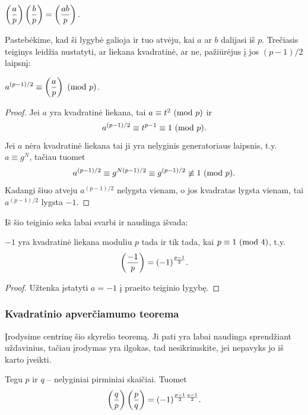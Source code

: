 \begin{teig} $\displaystyle \left(\frac{a}{p}\right)\left(\frac{b}{p}\right) = \left(\frac{ab}{p}\right).$ 
\end{teig}

Pastebėkime, kad ši lygybė galioja ir tuo atvėju, kai $a$ ar $b$ dalijasi
iš $p$. Trečiasis teiginys leidžia nustatyti, ar liekana kvadratinė, ar ne, pažiūrėjus
į jos $(p-1)/2$ laipsnį:

\begin{teig} $\displaystyle a^{(p-1)/2} \equiv \left(\frac{a}{p}\right) \ (\text{mod } p)$.
\end{teig}

\begin{proof} Jei $a$ yra kvadratinė liekana, tai $a\equiv t^2 \ (\text{mod } p)$ ir
  $$a^{(p-1)/2} \equiv t^{p-1} \equiv 1 \ (\text{mod } p).$$ Jei $a$ nėra
  kvadratinė liekana tai ji yra nelyginis generatoriaus laipsnis, t.y.
  $a\equiv g^N$, tačiau tuomet $$a^{(p-1)/2} \equiv g^{N(p-1)/2} \equiv g^{(p-1)/2}\not \equiv 1
  \ (\text{mod } p).$$ Kadangi šiuo atveju $a^{(p-1)/2}$ nelygsta vienam, o jos kvadratas
  lygsta vienam, tai $a^{(p-1)/2}$ lygsta $-1$.
\end{proof}

Iš šio teiginio seka labai svarbi ir naudinga išvada:

\begin{isv}
  $-1$ yra kvadratinė liekana moduliu $p$ tada ir tik tada, kai $p\equiv 1
  \ (\text{mod } 4)$, t.y. $$\left(\frac{-1}{p}\right)=(-1)^\frac{p-1}{2}.$$
\end{isv}

\begin{proof} Užtenka įstatyti $a=-1$ į praeito teiginio lygybę.
\end{proof}

\subsubsection{Kvadratinio apverčiamumo teorema}

Įrodysime centrinę šio skyrelio teoremą. Ji pati yra labai naudinga
sprendžiant uždavinius, tačiau įrodymas yra ilgokas, tad
nesikrimskite, jei nepavyks jo iš karto įveikti.

\begin{thm} 
  Tegu $p$ ir $q$ -- nelyginiai pirminiai skaičiai. Tuomet
  $$\left(\frac{q}{p}\right)\left(\frac{p}{q}\right)=(-1)^{\frac{p-1}{2}\frac{q-1}{2}}.$$
\end{thm}

